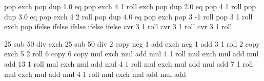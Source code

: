 {  { %
    pop exch pop
  }
  { dup 1.0 eq %
    { %
      pop exch 4 1 roll exch pop
    }
    { dup 2.0 eq %
      { %
      pop 4 1 roll pop
      }
      { dup 3.0 eq %
        { %
        pop exch 4 2 roll pop
        }
        { dup 4.0 eq %
          { %
          pop exch pop 3 -1 roll
          }
          { %
          pop 3 1 roll exch pop
          }
          ifelse
        }
        ifelse %
      }
      ifelse %
    }
    ifelse %
  }
  ifelse %
  cvr 3 1 roll cvr 3 1 roll cvr 3 1 roll
}


%
%


{\pgfpointorigin}
{\pgfpoint{100bp}{100bp}}
{
}{
  25 sub 50 div exch 25 sub 50 div 2 copy                   %
  neg 1 add exch neg 1 add                      %
  3 1 roll 2 copy exch 5 2 roll 6 copy 6 copy   %
  \pgf@lib@shadings@llred mul exch \pgf@lib@shadings@lrred mul add mul     %
  4 1 roll
  \pgf@lib@shadings@urred mul exch \pgf@lib@shadings@ulred mul add mul
  add
  13 1 roll
  \pgf@lib@shadings@llgreen mul exch \pgf@lib@shadings@lrgreen mul add mul %
  4 1 roll
  \pgf@lib@shadings@urgreen mul exch \pgf@lib@shadings@ulgreen mul add mul
  add
  7 1 roll
  \pgf@lib@shadings@llblue mul exch \pgf@lib@shadings@lrblue mul add mul   %
  4 1 roll
  \pgf@lib@shadings@urblue mul exch \pgf@lib@shadings@ulblue mul add mul
  add
}
